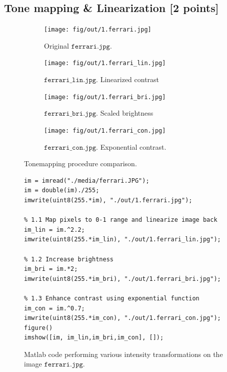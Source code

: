 \documentclass[tikz,14pt,fleqn]{article}
\begin{document}
\subsection{Tone mapping \& Linearization [2 points]}
\lipsum[1-4]
\begin{figure}[h!]
    \begin{subfigure}{0.5\textwidth}
        \centering
        \texttt{[image: fig/out/1.ferrari.jpg]}
        \caption{Original $\texttt{ferrari.jpg}$.}
    \end{subfigure}
    \begin{subfigure}{0.5\textwidth}
        \centering
        \texttt{[image: fig/out/1.ferrari\_lin.jpg]}
        \caption{$\texttt{ferrari\_lin.jpg}$. Linearized contrast}
    \end{subfigure}

    \begin{subfigure}{0.5\textwidth}
        \centering
        \texttt{[image: fig/out/1.ferrari\_bri.jpg]}
        \caption{$\texttt{ferrari\_bri.jpg}$. Scaled brightness}
    \end{subfigure}
    \begin{subfigure}{0.5\textwidth}
        \centering
        \texttt{[image: fig/out/1.ferrari\_con.jpg]}
        \caption{$\texttt {ferrari\_con.jpg}$. Exponential contrast.}
    \end{subfigure}

    \caption{Tonemapping procedure comparison.}
\end{figure}

\begin{figure}[h!]
    \begin{verbatim} 
im = imread("./media/ferrari.JPG");
im = double(im)./255;
imwrite(uint8(255.*im), "./out/1.ferrari.jpg");

% 1.1 Map pixels to 0-1 range and linearize image back
im_lin = im.^2.2;
imwrite(uint8(255.*im_lin), "./out/1.ferrari_lin.jpg");

% 1.2 Increase brightness
im_bri = im.*2;
imwrite(uint8(255.*im_bri), "./out/1.ferrari_bri.jpg");

% 1.3 Enhance contrast using exponential function
im_con = im.^0.7;
imwrite(uint8(255.*im_con), "./out/1.ferrari_con.jpg");
figure()
imshow([im, im_lin,im_bri,im_con], []);
        \end{verbatim}
\caption{Matlab code performing various intensity transformations on the image $\texttt{ferrari.jpg}$.}
\end{figure}
\end{document}
